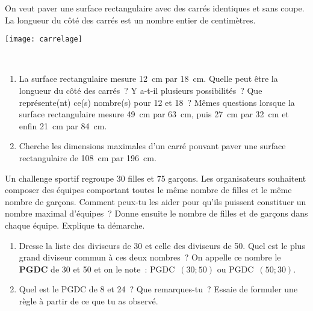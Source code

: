 \begin{activite}

\begin{partie}
 \begin{minipage}[c]{0.5\textwidth}
On veut paver une surface rectangulaire avec des carrés identiques et sans coupe. La longueur du côté des carrés est un nombre entier de centimètres.
 \end{minipage} \hfill%
 \begin{minipage}[c]{0.4\textwidth}
  \texttt{[image: carrelage]}
  \end{minipage} \\
 \begin{enumerate}
  \item La surface rectangulaire mesure 12 cm par 18 cm. Quelle peut être la longueur du côté des carrés ? Y a-t-il plusieurs possibilités ? Que représente(nt) ce(s) nombre(s) pour 12 et 18 ? Mêmes questions lorsque la surface rectangulaire mesure 49 cm par 63 cm, puis 27 cm par 32 cm et enfin 21 cm par 84 cm.
  \item Cherche les dimensions maximales d'un carré pouvant paver une surface rectangulaire de 108 cm par 196 cm.
  \end{enumerate}
\end{partie}

\begin{partie}
Un challenge sportif regroupe 30 filles et 75 garçons. Les organisateurs souhaitent composer des équipes comportant toutes le même nombre de filles et le même nombre de garçons. Comment peux-tu les aider pour qu'ils puissent constituer un nombre maximal d'équipes ? Donne ensuite le nombre de filles et de garçons dans chaque équipe. Explique ta démarche.
\end{partie}

\begin{partie}[PGDC]
\begin{enumerate}
 \item Dresse la liste des diviseurs de 30 et celle des diviseurs de 50. Quel est le plus grand diviseur commun à ces deux nombres ? On appelle ce nombre le \textbf{PGDC} de 30 et 50 et on le note : PGDC $(30 ; 50)$ ou PGDC $(50 ; 30)$.
 \item Quel est le PGDC de 8 et 24 ? Que remarques-tu ? Essaie de formuler une règle à partir de ce que tu as observé.
 \end{enumerate}
\end{partie}

\end{activite}

